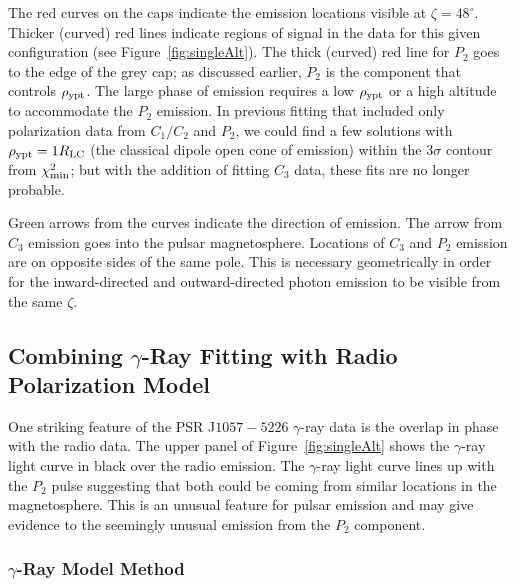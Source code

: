 The red curves on the caps indicate the 
emission locations visible at $\zeta=48^\circ$.  Thicker (curved)
red lines indicate regions of signal in the data for this
given configuration (see Figure~\ref{fig:singleAlt}). 
The thick (curved) red line for $P_2$ goes to the
edge of the grey cap; as discussed earlier, $P_2$
is the component that controls $\rho_{\rm{ypt}}$.
The large phase of emission
requires a low $\rho_{\rm{ypt}}$ or a high altitude
to accommodate the 
$P_2$ emission.  In previous fitting that included only 
polarization data from $C_1/C_2$ and $P_2$, we
could find a few solutions with $\rho_{\rm{ypt}}=1R_{\rm{LC}}$
(the classical dipole open cone of emission) 
within the $3\sigma$ contour from $\chi^2_{\rm{min}}$;
but with the addition of fitting $C_3$ data,
these fits are no longer probable.  

Green arrows from the curves indicate the direction of emission.
The arrow from $C_3$ emission goes into the pulsar magnetosphere.
Locations of $C_3$ and $P_2$ emission are on opposite sides of the same pole.
This is necessary geometrically in order for the inward-directed and
outward-directed photon emission to be visible from the same $\zeta$.

\subsection{Combining $\gamma$-Ray Fitting with Radio Polarization Model}
\label{sec:gam}
One striking feature of the PSR J$1057-5226$ $\gamma$-ray data is the overlap in phase
with the radio data.  
The upper panel of Figure~\ref{fig:singleAlt} shows
the $\gamma$-ray light curve in black over the radio emission.  The 
$\gamma$-ray light curve lines up with the $P_2$ pulse suggesting that
both could be coming from similar locations in the magnetosphere.  
This is an unusual feature for pulsar emission and may give evidence to 
the seemingly unusual emission from the $P_2$ component.

\subsubsection{$\gamma$-Ray Model Method}

